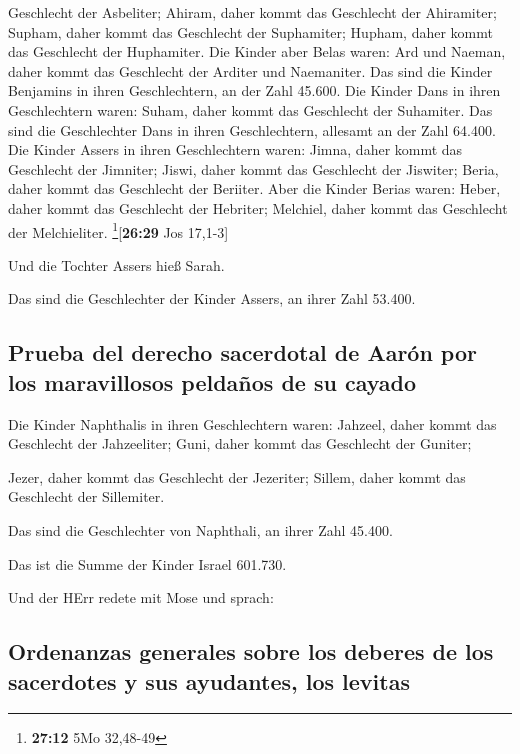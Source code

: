 Geschlecht der Asbeliter; Ahiram, daher kommt das Geschlecht der
Ahiramiter;  Supham, daher kommt das Geschlecht der
Suphamiter; Hupham, daher kommt das Geschlecht der Huphamiter.
 Die Kinder aber Belas waren: Ard und Naeman, daher kommt
das Geschlecht der Arditer und Naemaniter.  Das sind die
Kinder Benjamins in ihren Geschlechtern, an der Zahl 45.600.
 Die Kinder Dans in ihren Geschlechtern waren: Suham,
daher kommt das Geschlecht der Suhamiter.  Das sind die
Geschlechter Dans in ihren Geschlechtern, allesamt an der Zahl 64.400.
 Die Kinder Assers in ihren Geschlechtern waren: Jimna,
daher kommt das Geschlecht der Jimniter; Jiswi, daher kommt das
Geschlecht der Jiswiter; Beria, daher kommt das Geschlecht der Beriiter.
 Aber die Kinder Berias waren: Heber, daher kommt das
Geschlecht der Hebriter; Melchiel, daher kommt das Geschlecht der
Melchieliter. \footnote{\textbf{27:12} 5Mo 32,48-49}{[}\textbf{26:29}
Jos 17,1-3{]}

 Und die Tochter Assers hieß Sarah.

 Das sind die Geschlechter der Kinder Assers, an ihrer
Zahl 53.400.

\hypertarget{prueba-del-derecho-sacerdotal-de-aaruxf3n-por-los-maravillosos-peldauxf1os-de-su-cayado}{%
\subsection{Prueba del derecho sacerdotal de Aarón por los maravillosos
peldaños de su
cayado}\label{prueba-del-derecho-sacerdotal-de-aaruxf3n-por-los-maravillosos-peldauxf1os-de-su-cayado}}

 Die Kinder Naphthalis in ihren Geschlechtern waren:
Jahzeel, daher kommt das Geschlecht der Jahzeeliter; Guni, daher kommt
das Geschlecht der Guniter;

 Jezer, daher kommt das Geschlecht der Jezeriter; Sillem,
daher kommt das Geschlecht der Sillemiter.

 Das sind die Geschlechter von Naphthali, an ihrer Zahl
45.400.

 Das ist die Summe der Kinder Israel 601.730.

 Und der HErr redete mit Mose und sprach:

\hypertarget{ordenanzas-generales-sobre-los-deberes-de-los-sacerdotes-y-sus-ayudantes-los-levitas}{%
\subsection{Ordenanzas generales sobre los deberes de los sacerdotes y
sus ayudantes, los
levitas}\label{ordenanzas-generales-sobre-los-deberes-de-los-sacerdotes-y-sus-ayudantes-los-levitas}}

